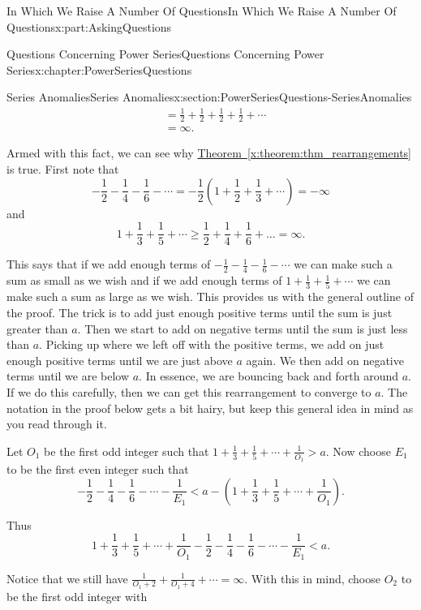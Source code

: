 \documentclass[oneside,10pt,]{book}
\newcommand{\xreffont}{\relax}
\numberwithin{equation}{section}
\newcommand{\lt}{<}
\newcommand{\amp}{&}
\begin{document}
\begin{partptx}{In Which We Raise A Number Of Questions}{}{In Which We Raise A Number Of Questions}{}{}{x:part:AskingQuestions}
\begin{chapterptx}{Questions Concerning Power Series}{}{Questions Concerning Power Series}{}{}{x:chapter:PowerSeriesQuestions}
\begin{sectionptx}{Series Anomalies}{}{Series Anomalies}{}{}{x:section:PowerSeriesQuestions-SeriesAnomalies}
\begin{align*}
\amp =\frac{1}{2}+\frac{1}{2}+\frac{1}{2}+\frac{1}{2}+\cdots\\
\amp =   \infty\text{.}
\end{align*}
%
\par
Armed with this fact, we can see why \hyperref[x:theorem:thm_rearrangements]{Theorem~{\xreffont\ref{x:theorem:thm_rearrangements}}} is true. First note that%
\begin{equation*}
-\frac{1}{2}-\frac{1}{4}-\frac{1}{6}-\cdots=-\frac{1}{2}(1+\frac{1}{2}+ \frac{1}{3}+\cdots)=-\infty
\end{equation*}
and%
\begin{equation*}
1+\frac{1}{3}+\frac{1}{5}+\cdots\geq\frac{1}{2}+\frac{1}{4}+\frac{1}{6}+\ldots= \infty\text{.}
\end{equation*}
%
\par
This says that if we add enough terms of \(-\frac{1}{2}-\frac{1}{4}-\frac{1}{6}-\cdots\) we can make such a sum as small as we wish and if we add enough terms of \(1+\frac{1}{3}+\frac{1}{5}+\cdots\) we can make such a sum as large as we wish. This provides us with the general outline of the proof. The trick is to add just enough positive terms until the sum is just greater than \(a\). Then we start to add on negative terms until the sum is just less than \(a\). Picking up where we left off with the positive terms, we add on just enough positive terms until we are just above \(a\) again. We then add on negative terms until we are below \(a\). In essence, we are bouncing back and forth around \(a\). If we do this carefully, then we can get this rearrangement to converge to \(a\). The notation in the proof below gets a bit hairy, but keep this general idea in mind as you read through it.%
\par
Let \(O_1\) be the first odd integer such that \(1+\frac{1}{3}+\frac{1}{5}+\cdots+\frac{1}{O_1}>a\). Now choose \(E_1\) to be the first even integer such that%
\begin{equation*}
-\frac{1}{2}-\frac{1}{4}-\frac{1}{6}-\cdots-\frac{1}{E_1} \lt a-\left(1+\frac{1}{3}+\frac{1}{5}+\cdots+\frac{1}{O_1}\right)\text{.}
\end{equation*}
%
\par
Thus%
\begin{equation*}
1+\frac{1}{3}+\frac{1}{5}+\cdots+\frac{1}{O_1}-\frac{1}{2}-\frac{1}{4} - \frac{1}{6}-\cdots-\frac{1}{E_1}\lt a\text{.}
\end{equation*}
%
\par
Notice that we still have \(\frac{1}{O_1+2}+\frac{1}{O_1+4}+\cdots=\infty\). With this in mind, choose \(O_2\) to be the first odd integer with%

\end{sectionptx}
\end{chapterptx}
\end{partptx}
\end{document}
